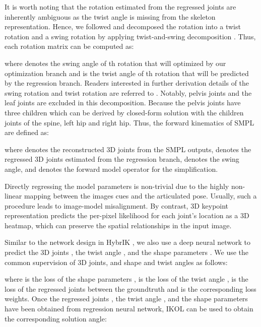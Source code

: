 \documentclass[letterpaper]{article} \usepackage{aaai23}  \usepackage{times}  \usepackage{helvet}  \usepackage{courier}  \usepackage[hyphens]{url}  \usepackage{graphicx} \urlstyle{rm} \def\UrlFont{\rm}  \usepackage{natbib}  \usepackage{caption} \frenchspacing  \setlength{\pdfpagewidth}{8.5in}  \setlength{\pdfpageheight}{11in}  \usepackage{algorithm}
\begin{document}
It is worth noting that the rotation estimated from the regressed joints  are inherently ambiguous as the twist angle is missing from the skeleton representation. Hence, we followed \cite{li2021hybrik} and decomposed the rotation  into a twist rotation  and a swing rotation  by applying twist-and-swing decomposition \cite{baerlocher2001parametrization}. Thus, each rotation matrix can be computed as:

where  denotes the swing angle of th rotation that will optimized by our optimization branch and  is the twist angle of th rotation that will be predicted by the regression branch. Readers interested in further derivation details of the swing rotation  and twist rotation  are referred to \cite{li2021hybrik}. Notably, pelvis joints and the leaf joints are excluded in this decomposition. Because the pelvis joints have three children which can be derived by closed-form solution with the children joints of the spine, left hip and right hip. 
Thus, the forward kinematics of SMPL are defined as:

where  denotes the reconstructed 3D joints from the SMPL outputs,  denotes the regressed 3D joints estimated from the regression branch,  denotes the swing angle, and  denotes the forward model operator for the simplification. 

Directly regressing the model parameters is non-trivial due to the highly non-linear mapping between the images cues and the articulated pose. Usually, such a procedure leads to image-model misalignment. By contrast, 3D keypoint representation predicts the per-pixel likelihood for each joint’s location as a 3D heatmap, which can preserve the spatial relationships in the input image. 

Similar to the network design in HybrIK \cite{li2021hybrik}, we also use a deep neural network to predict the 3D joints , the twist angle , and the shape parameters . We use the common supervision of 3D joints, and shape and twist angles as follows:




 
where  is the  loss of the shape parameters ,  is the  loss of the twist angle ,  is the  loss of the regressed joints between the groundtruth and  is the corresponding loss weights. Once the regressed joints , the twist angle , and the shape parameters  have been obtained from regression neural network, IKOL can be used to obtain the corresponding solution angle:

 
\end{document}
